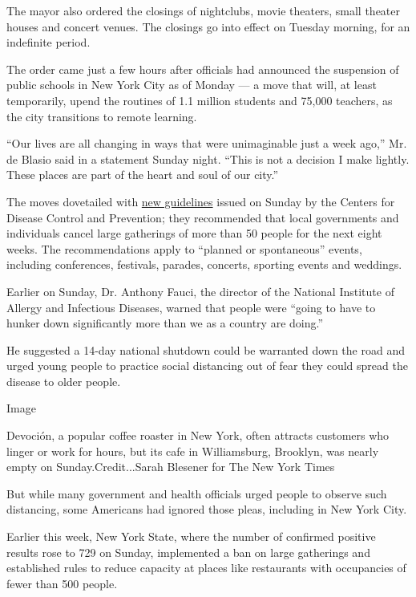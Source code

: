 The mayor also ordered the closings of nightclubs, movie theaters, small
theater houses and concert venues. The closings go into effect on
Tuesday morning, for an indefinite period.

The order came just a few hours after officials had announced the
suspension of public schools in New York City as of Monday --- a move
that will, at least temporarily, upend the routines of 1.1 million
students and 75,000 teachers, as the city transitions to remote
learning.

``Our lives are all changing in ways that were unimaginable just a week
ago,'' Mr. de Blasio said in a statement Sunday night. ``This is not a
decision I make lightly. These places are part of the heart and soul of
our city.''

The moves dovetailed with
\href{https://www.cdc.gov/coronavirus/2019-ncov/community/large-events/mass-gatherings-ready-for-covid-19.html}{new
guidelines} issued on Sunday by the Centers for Disease Control and
Prevention; they recommended that local governments and individuals
cancel large gatherings of more than 50 people for the next eight weeks.
The recommendations apply to ``planned or spontaneous'' events,
including conferences, festivals, parades, concerts, sporting events and
weddings.

Earlier on Sunday, Dr. Anthony Fauci, the director of the National
Institute of Allergy and Infectious Diseases, warned that people were
``going to have to hunker down significantly more than we as a country
are doing.''

He suggested a 14-day national shutdown could be warranted down the road
and urged young people to practice social distancing out of fear they
could spread the disease to older people.

Image

Devoción, a popular coffee roaster in New York, often attracts customers
who linger or work for hours, but its cafe in Williamsburg, Brooklyn,
was nearly empty on Sunday.Credit...Sarah Blesener for The New York
Times

But while many government and health officials urged people to observe
such distancing, some Americans had ignored those pleas, including in
New York City.

Earlier this week, New York State, where the number of confirmed
positive results rose to 729 on Sunday, implemented a ban on large
gatherings and established rules to reduce capacity at places like
restaurants with occupancies of fewer than 500 people.


